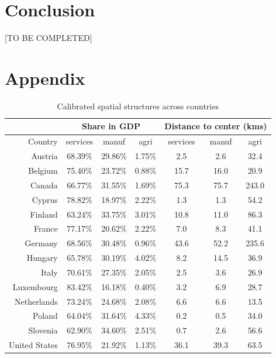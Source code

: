 \documentclass[12pt]{article}
\begin{document}
\section{Conclusion}
[TO BE COMPLETED]

\clearpage





\clearpage

\section{Appendix}

\begin{table}[htbp]
  \centering
  \caption{Calibrated spatial structures across countries}
    \begin{tabular}{rcccccc}
    \toprule
          & \multicolumn{3}{c}{Share in GDP} & \multicolumn{3}{c}{Distance to center (kms)} \\
    \midrule
    Country & services & manuf & agri  & services & manuf & agri \\
    Austria & 68.39\% & 29.86\% & 1.75\% & 2.5   & 2.6   & 32.4 \\
    Belgium & 75.40\% & 23.72\% & 0.88\% & 15.7  & 16.0  & 20.9 \\
    Canada & 66.77\% & 31.55\% & 1.69\% & 75.3  & 75.7  & 243.0 \\
    Cyprus & 78.82\% & 18.97\% & 2.22\% & 1.3   & 1.3   & 54.2 \\
    Finland & 63.24\% & 33.75\% & 3.01\% & 10.8  & 11.0  & 86.3 \\
    France & 77.17\% & 20.62\% & 2.22\% & 7.0   & 8.3   & 41.1 \\
    Germany & 68.56\% & 30.48\% & 0.96\% & 43.6  & 52.2  & 235.6 \\
    Hungary & 65.78\% & 30.19\% & 4.02\% & 8.2   & 14.5  & 36.9 \\
    Italy & 70.61\% & 27.35\% & 2.05\% & 2.5   & 3.6   & 26.9 \\
    Luxembourg & 83.42\% & 16.18\% & 0.40\% & 3.2   & 6.9   & 28.7 \\
    Netherlands & 73.24\% & 24.68\% & 2.08\% & 6.6   & 6.6   & 13.5 \\
    Poland & 64.04\% & 31.64\% & 4.33\% & 0.2   & 0.5   & 34.0 \\
    Slovenia & 62.90\% & 34.60\% & 2.51\% & 0.7   & 2.6   & 56.6 \\
    United States & 76.95\% & 21.92\% & 1.13\% & 36.1  & 39.3  & 63.5 \\
    \bottomrule
    \end{tabular}%
  \label{tab:share_dist}%
\end{table}%
\end{document}
